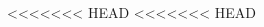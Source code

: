 \documentclass{../../oss-apphys-exam}
\begin{document}
\begin{multicols*}{2}
\begin{questions}

<<<<<<< HEAD
<<<<<<< HEAD


\end{questions}
\end{multicols*}
\end{document}
